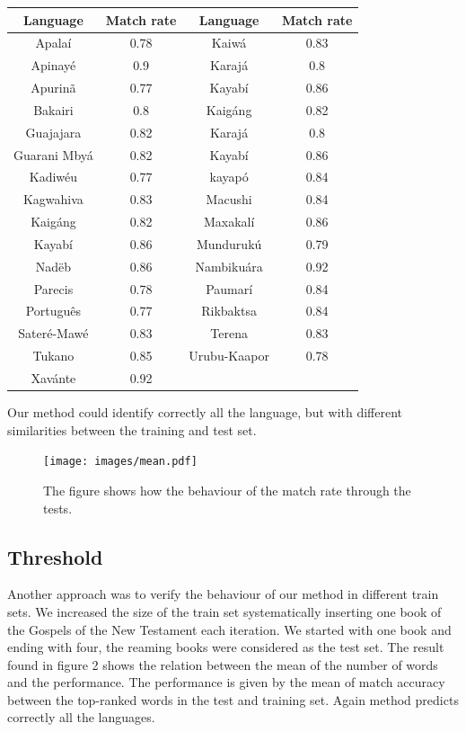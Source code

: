 \documentclass[runningheads]{llncs}
\begin{document}
    \begin{center}
        \begin{tabular}{ ||c c | c c || }
            \hline
            Language & Match rate & Language & Match rate\\
            \hline
            Apalaí &  0.78 & Kaiwá &  0.83 \\
            Apinayé &  0.9 & Karajá & 0.8 \\
            Apurinã &  0.77 & Kayabí & 0.86 \\
            Bakairi &  0.8 & Kaigáng &  0.82 \\
            Guajajara &  0.82 & Karajá & 0.8 \\
            Guarani Mbyá &  0.82 & Kayabí & 0.86 \\
            Kadiwéu &  0.77 & kayapó &  0.84 \\
            Kagwahiva & 0.83 & Macushi &  0.84 \\
            Kaigáng &  0.82 & Maxakalí & 0.86 \\
            Kayabí & 0.86 & Mundurukú  & 0.79\\
            Nadëb & 0.86 & Nambikuára & 0.92 \\
            Parecis & 0.78 & Paumarí &  0.84\\
            Português & 0.77 & Rikbaktsa &  0.84\\
            Sateré-Mawé & 0.83 & Terena & 0.83\\
            Tukano &  0.85 & Urubu-Kaapor &  0.78\\
            Xavánte & 0.92\\
            \hline
        \end{tabular}
    \end{center}

    Our method could identify correctly all the language, but with different similarities between the training and test set.

    \begin{figure}[ht!]
        \centering
        \texttt{[image: images/mean.pdf]}
        \caption{The figure shows how the behaviour of the match rate through the tests.}
        \label{fig:Fig2}
    \end{figure}
    \subsection{Threshold}\label{subsec:threshold}

    Another approach was to verify the behaviour of our method in different train sets. We increased the size of the train set systematically inserting one book of the Gospels of the New Testament each iteration. We started with one book and ending with four, the reaming books were considered as the test set. The result found in figure 2 shows the relation between the mean of the number of words and the performance. The performance is given by the mean of match accuracy between the top-ranked words in the test and training set. Again method predicts correctly all the languages.
\end{document}
